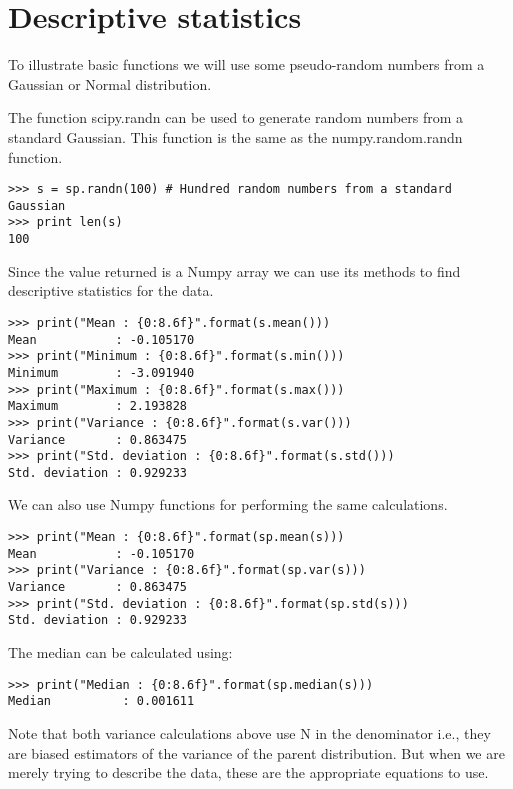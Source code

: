 \section{Descriptive statistics}

To illustrate basic functions we will use some pseudo-random numbers from a Gaussian or Normal distribution. 

The function scipy.randn can be used to generate random numbers from a standard Gaussian. This function is the same as the numpy.random.randn function.

\begin{framed}
\begin{verbatim}
>>> s = sp.randn(100) # Hundred random numbers from a standard Gaussian
>>> print len(s)
100
\end{verbatim}
\end{framed}
Since the value returned is a Numpy array we can use its methods to find descriptive statistics for the data.

\begin{framed}
\begin{verbatim}
>>> print("Mean : {0:8.6f}".format(s.mean()))
Mean           : -0.105170
>>> print("Minimum : {0:8.6f}".format(s.min()))
Minimum        : -3.091940
>>> print("Maximum : {0:8.6f}".format(s.max()))
Maximum        : 2.193828
>>> print("Variance : {0:8.6f}".format(s.var()))
Variance       : 0.863475
>>> print("Std. deviation : {0:8.6f}".format(s.std()))
Std. deviation : 0.929233
\end{verbatim}
\end{framed}
We can also use Numpy functions for performing the same calculations.

\begin{framed}
\begin{verbatim}
>>> print("Mean : {0:8.6f}".format(sp.mean(s)))
Mean           : -0.105170
>>> print("Variance : {0:8.6f}".format(sp.var(s)))
Variance       : 0.863475
>>> print("Std. deviation : {0:8.6f}".format(sp.std(s)))
Std. deviation : 0.929233
\end{verbatim}
\end{framed}

The median can be calculated using:
\begin{framed}
\begin{verbatim}
>>> print("Median : {0:8.6f}".format(sp.median(s)))
Median          : 0.001611
\end{verbatim}
\end{framed}
Note that both variance calculations above use N in the denominator i.e., they are biased estimators of the variance of the parent distribution. But when we are merely trying to describe the data, these are the appropriate equations to use.

